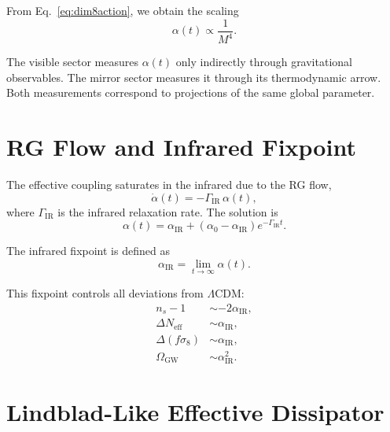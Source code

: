 \documentclass[11pt,a4paper]{article}
\begin{document}
From Eq.~\eqref{eq:dim8action}, we obtain the scaling
\begin{equation}
\alpha(t) \propto \frac{1}{M^4}.
\end{equation}

The visible sector measures $\alpha(t)$ only indirectly through gravitational
observables. The mirror sector measures it through its thermodynamic arrow.
Both measurements correspond to projections of the same global parameter.

\section{RG Flow and Infrared Fixpoint}

The effective coupling saturates in the infrared due to the RG flow,
\begin{equation}
\dot{\alpha}(t) = - \Gamma_{\mathrm{IR}} \, \alpha(t),
\end{equation}
where $\Gamma_{\mathrm{IR}}$ is the infrared relaxation rate. The solution is
\begin{equation}
\alpha(t)
=
\alpha_{\mathrm{IR}}
+
\left( \alpha_0 - \alpha_{\mathrm{IR}} \right)
e^{-\Gamma_{\mathrm{IR}} t}.
\end{equation}

The infrared fixpoint is defined as
\begin{equation}
\alpha_{\mathrm{IR}} = \lim_{t \to \infty} \alpha(t).
\end{equation}

This fixpoint controls all deviations from $\Lambda$CDM:
\begin{align}
n_s - 1 &\sim -2\alpha_{\mathrm{IR}}, \\
\Delta N_{\mathrm{eff}} &\sim \alpha_{\mathrm{IR}}, \\
\Delta(f\sigma_8) &\sim \alpha_{\mathrm{IR}}, \\
\Omega_{\mathrm{GW}} &\sim \alpha_{\mathrm{IR}}^2.
\end{align}

\section{Lindblad-Like Effective Dissipator}
\end{document}
